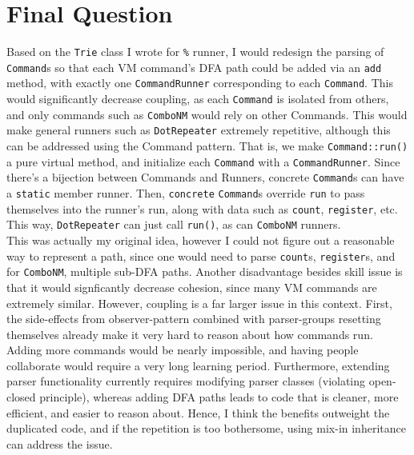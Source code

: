 \documentclass{article}
\begin{document}
\section{Final Question}
Based on the \texttt{Trie} class I wrote for \texttt{\%} runner, 
I would redesign the parsing of \texttt{Command}s 
so that each VM command's DFA path could be added via an \texttt{add} method, 
with exactly one \texttt{CommandRunner} corresponding to each \texttt{Command}. 
This would significantly decrease coupling, as each \texttt{Command} 
is isolated from others, and only commands such as \texttt{ComboNM} 
would rely on other Commands. 
This would make general runners such as \texttt{DotRepeater} 
extremely repetitive, although this can be addressed using the Command pattern. 
That is, we make \texttt{Command::run()} a pure virtual method, 
and initialize each \texttt{Command} with a \texttt{CommandRunner}. 
Since there's a bijection between Commands and Runners, 
concrete \texttt{Command}s can have a \texttt{static} member runner. 
Then, \texttt{concrete} \texttt{Command}s override \texttt{run} to 
pass themselves into the runner's run, along with data such as \texttt{count}, 
\texttt{register}, etc. 
This way, \texttt{DotRepeater} can just call \texttt{run()}, 
as can \texttt{ComboNM} runners. 
\\This was actually my original idea, however I could not figure out a reasonable 
way to represent a path, since one would need to parse \texttt{count}s, 
\texttt{register}s, and for \texttt{ComboNM}, multiple sub-DFA paths. 
Another disadvantage besides skill issue is that 
it would signficantly decrease cohesion,
since many VM commands are extremely similar. 
However, coupling is a far larger issue in this context. 
First, the side-effects from observer-pattern 
combined with parser-groups resetting themselves 
already make it very hard to reason about how commands run. 
Adding more commands would be nearly impossible, and having people collaborate 
would require a very long learning period. 
Furthermore, extending parser functionality currently requires modifying parser classes
(violating open-closed principle), whereas adding DFA paths leads to code that 
is cleaner, more efficient, and easier to reason about. 
Hence, I think the benefits outweight the duplicated code, 
and if the repetition is too bothersome, using mix-in inheritance can address the issue. 
\end{document}
